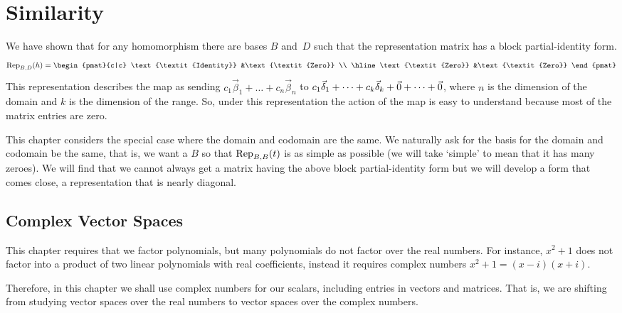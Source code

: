 \chapter{Similarity}
We have shown that for any 
homomorphism there are bases $B$ and~$D$ such that the 
representation matrix has a block partial-identity form.
\begin{equation*}
  \rep{h}{B,D}
  =
    \begin{pmat}{c|c}
       \text{\textit{Identity}}  &\text{\textit{Zero}}   \\
       \hline
       \text{\textit{Zero}}      &\text{\textit{Zero}}
    \end{pmat}
\end{equation*}
This representation describes the map as sending
\( c_1\vec{\beta}_1+\dots+c_n\vec{\beta}_n \) to
\(c_1\vec{\delta}_1+\dots+c_k\vec{\delta}_k+\zero+\dots+\zero \),
where $n$ is the dimension of the domain and \( k \) is the dimension of
the range.
So, under this representation 
the action of the map is easy to understand 
because most of the matrix entries are zero.

This chapter considers the special case where the domain and
codomain are the same.
We naturally ask for the basis for the domain and codomain be the same, that is,
we want a \( B \) so that \( \rep{t}{B,B} \) is as simple as possible
(we will take `simple' to mean that it has many zeroes).
We will find that we 
cannot always get a matrix having the above block partial-identity form
but we will develop a form that comes close, a
representation that is nearly diagonal.













\section{Complex Vector Spaces}
This chapter requires that we factor polynomials,
but many polynomials do not factor over the real numbers.
For instance,
\( x^2+1 \) does not factor into a product of two linear polynomials
with real coefficients,
instead it requires complex numbers $x^2+1=(x-i)(x+i)$.

Therefore, in this chapter 
we shall use complex numbers for our scalars,
including entries in vectors and matrices. 
That is, we are shifting from studying vector spaces over the real numbers
to vector spaces over the complex numbers.

